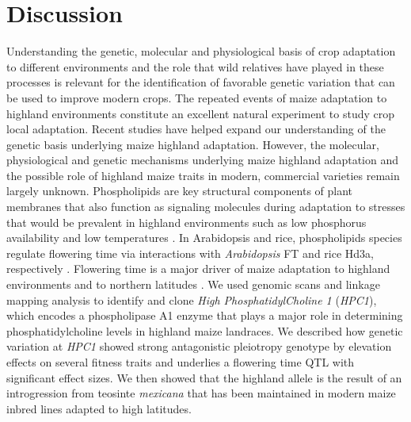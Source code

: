\documentclass[9pt,twocolumn,twoside,lineno]{biorxiv}
\newcommand{\mex}{\textit{mexicana}\xspace}
\newcommand{\hpc}{\textit{HPC1}\xspace}
\begin{document}
 \section{Discussion}
\label{sec:discussion}
Understanding the genetic, molecular and  physiological basis of crop adaptation to different environments and the role that wild relatives have played in these processes is relevant for the identification of favorable genetic variation that can be used to improve modern crops.
The repeated events of maize adaptation to highland environments constitute an excellent natural experiment to study crop local adaptation. 
Recent studies \cite{Wang2020-mp, Takuno2015-uj, Crow2020-gene} have helped expand our understanding of the genetic basis underlying maize highland adaptation. 
However, the molecular, physiological and genetic mechanisms underlying maize highland adaptation and the possible role of highland maize traits in modern, commercial varieties remain largely unknown.
Phospholipids are key structural components of plant membranes that also function as signaling molecules during adaptation to stresses that would be prevalent in highland environments \cite{Ryu2004-iv, Nakamura2017-vb} such as low phosphorus availability \cite{Veneklaas2012-ls, Cruz-Ramirez2004-ib, Lambers2012-an} and low temperatures \cite{Degenkolbe2012-wf, Welti2002-uk, Marla2017-ph}. 
In Arabidopsis and rice, phospholipids species regulate flowering time via interactions with \textit{Arabidopsis} FT and rice Hd3a, respectively \cite{Nakamura2014-qf, Susila2021-dz, Qu2021-wc}. 
Flowering time is a major driver of maize adaptation to highland environments \cite{Romero_Navarro2017-cn, Gates2019-xu, Mercer2019-vj} and to northern latitudes \cite{Hung2012-ms, Swarts2017-ge}.
We used genomic scans and linkage mapping analysis to identify and clone \textit{High PhosphatidylCholine 1} (\hpc), which encodes a phospholipase A1 enzyme that plays a major role in determining phosphatidylcholine levels in highland maize landraces.
We described how genetic variation at \hpc showed strong antagonistic pleiotropy  genotype by elevation effects on several fitness traits and underlies a flowering time QTL with significant effect sizes.
We then showed that the highland allele is the result of an introgression from teosinte \mex that has been maintained in modern maize inbred lines adapted to high latitudes.
\end{document}
